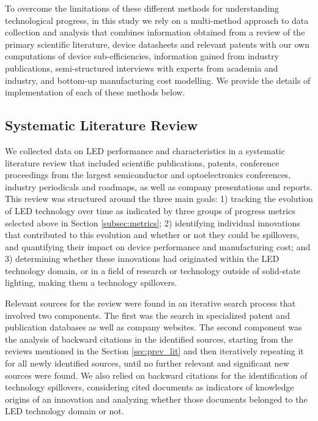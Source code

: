 \documentclass[twoside,twocolumn,9pt]{article}
\begin{document}
To overcome the limitations of these different methods for understanding technological progress, in this study we rely on a multi-method approach to data collection and analysis that combines information obtained from a review of the primary scientific literature, device datasheets and relevant patents with our own computations of device sub-efficiencies, information gained from industry publications, semi-structured interviews with experts from academia and industry, and bottom-up manufacturing cost modelling. We provide the details of implementation of each of these methods below.

\subsection{Systematic Literature Review}

We collected data on LED performance and characteristics in a systematic literature review that included scientific publications, patents, conference proceedings from the largest semiconductor and optoelectronics conferences, industry periodicals and roadmaps, as well as company presentations and reports. This review was structured around the three main goals: 1) tracking the evolution of LED technology over time as indicated by three groups of progress metrics selected above in Section \ref{subsec:metrics}; 2) identifying individual innovations that contributed to this evolution and whether or not they could be spillovers, and quantifying their impact on device performance and manufacturing cost; and 3) determining whether these innovations had originated within the LED technology domain, or in a field of research or technology outside of solid-state lighting, making them a technology spillovers. 

Relevant sources for the review were found in an iterative search process that involved two components. The first was the search in specialized patent and publication databases as well as company websites. The second component was the analysis of backward citations in the identified sources, starting from the reviews mentioned in the Section \ref{sec:prev_lit} and then iteratively repeating it for all newly identified sources, until no further relevant and significant new sources were found. We also relied on backward citations for the identification of technology spillovers, considering cited documents as indicators of knowledge origins of an innovation and analyzing whether those documents belonged to the LED technology domain or not.
\end{document}
